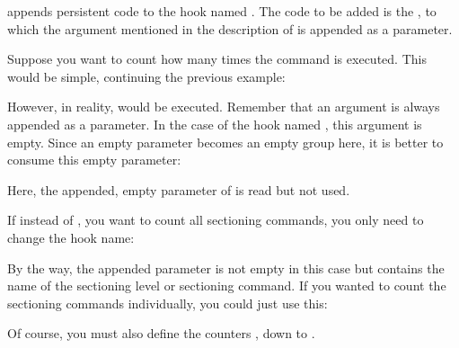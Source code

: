 \begin{Declaration}
\end{Declaration}
 appends
persistent code to the hook named . The code to be added is the
, to which the argument mentioned in the description of
 is appended as a parameter.
\begin{Example}
  Suppose you want to count how many times the  command is
  executed. This would be simple, continuing the previous example:
\begin{lstcode}
              {}
\end{lstcode}
  However, in reality, %
  \PParameter{} would be executed. Remember that an argument is always appended
  as a parameter. In the case of the hook named
  , this argument is empty. Since an empty
  parameter becomes an empty group here, it is better to consume this empty
  parameter:
\begin{lstcode}
  \newcommand*{\stepcountergobble}[2]{%
    \stepcounter{#1}%
  }
              {}
\end{lstcode}
  Here, the appended, empty parameter of  is read but
  not used.

  If instead of , you want to count all sectioning commands, you
  only need to change the hook name:
\begin{lstcode}
              {}
\end{lstcode}
  By the way, the appended parameter is not empty in this case but contains the
  name of the sectioning level or sectioning command. If you wanted to count
  the sectioning commands individually, you could just use this:
\begin{lstcode}
  \newcommand*{\stepCounter}[1]{%
    \stepcounter{#1Counter}%
  }
              {\stepCounter}
\end{lstcode}
  Of course, you must also define the counters ,
   down to .
\end{Example}

